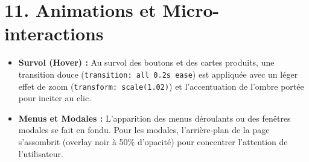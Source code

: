 \documentclass[12pt,a4paper]{article}
\begin{document}
\section{11. Animations et Micro-interactions}
\begin{itemize}[label=\textcolor{CoalBlack}{\tiny\faCircle}, itemsep=0pt]
    \item \textbf{Survol (Hover) :} Au survol des boutons et des cartes produits, une transition douce (\texttt{transition: all 0.2s ease}) est appliquée avec un léger effet de zoom (\texttt{transform: scale(1.02)}) et l'accentuation de l'ombre portée pour inciter au clic.
    \item \textbf{Menus et Modales :} L'apparition des menus déroulants ou des fenêtres modales se fait en fondu. Pour les modales, l'arrière-plan de la page s'assombrit (overlay noir à 50\% d'opacité) pour concentrer l'attention de l'utilisateur.
\end{itemize}
\end{document}
